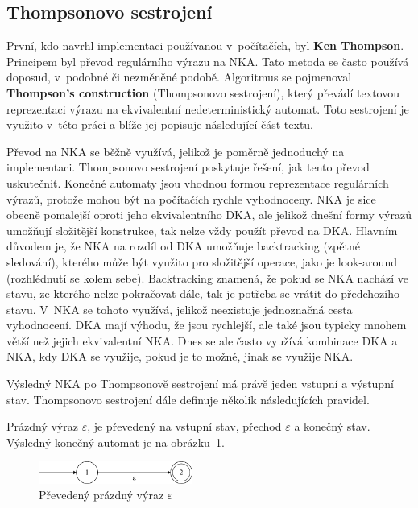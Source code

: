 \subsection*{Thompsonovo sestrojení}

První, kdo navrhl implementaci používanou v~počítačích, byl \textbf{Ken Thompson}\cite{ScanToPDF}.
Principem byl převod regulárního výrazu na NKA.
Tato metoda se často používá doposud, v~podobné či nezměněné podobě.
Algoritmus se pojmenoval \textbf{Thompson's construction} (Thompsonovo sestrojení), který převádí textovou reprezentaci výrazu na ekvivalentní nedeterministický automat.
Toto sestrojení je využito v~této práci a blíže jej popisuje následující část textu.

Převod na NKA se běžně využívá, jelikož je poměrně jednoduchý na implementaci.
Thompsonovo sestrojení poskytuje řešení, jak tento převod uskutečnit.
Konečné automaty jsou vhodnou formou reprezentace regulárních výrazů, protože mohou být na počítačích rychle vyhodnoceny.
NKA je sice obecně pomalejší oproti jeho ekvivalentního DKA, ale jelikož dnešní formy výrazů umožňují složitější konstrukce, tak nelze vždy použít převod na DKA.
Hlavním důvodem je, že NKA na rozdíl od DKA umožňuje backtracking (zpětné sledování), kterého může být využito pro složitější operace, jako je look-around (rozhlédnutí se kolem sebe).
Backtracking znamená, že pokud se NKA nachází ve stavu, ze kterého nelze pokračovat dále, tak je potřeba se vrátit do předchozího stavu.
V~NKA se tohoto využívá, jelikož neexistuje jednoznačná cesta vyhodnocení.
DKA mají výhodu, že jsou rychlejší, ale také jsou typicky mnohem větší než jejich ekvivalentní NKA.
Dnes se ale často využívá kombinace DKA a NKA, kdy DKA se využije, pokud je to možné, jinak se využije NKA.

Výsledný NKA po Thompsonově sestrojení má právě jeden vstupní a výstupní stav. 
Thompsonovo sestrojení dále definuje několik následujících pravidel.

Prázdný výraz \textit{$\varepsilon$}, je převedený na vstupní stav, přechod \textit{$\varepsilon$} a konečný stav.
Výsledný konečný automat je na obrázku~\ref{fig:NFAepsilon}.
\begin{figure}[!h]
	\centering
	\includegraphics[width=0.45\textwidth]{Figures/NFA_epsilon.pdf}
	\caption{Převedený prázdný výraz $\varepsilon$}
	\label{fig:NFAepsilon}
\end{figure}

